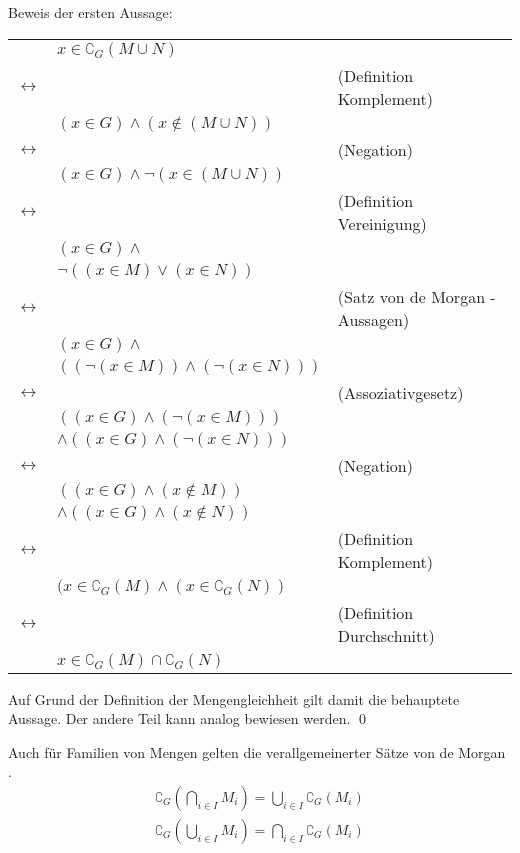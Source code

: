 \begin{Unit}
Beweis der ersten Aussage:\\
\begin{tabular}{l l | l}
                  & $x \in \complement_G(M \cup N)$ & \\
$\leftrightarrow$ & & (Definition Komplement) \\
                  & $(x \in G) \land (x \notin (M \cup N))$ & \\
$\leftrightarrow$ & & (Negation) \\
                  & $(x \in G) \land\neg (x \in (M \cup N))$ & \\
$\leftrightarrow$ & & (Definition Vereinigung) \\
                  & $(x \in G) \land$ & \\
                  &  $\neg((x \in M) \lor (x \in N))$ & \\
$\leftrightarrow$ & & (Satz von de Morgan - Aussagen) \\
                  & $(x \in G) \land $ &  \\
                  & $((\neg(x \in M)) \land (\neg(x \in N)))$ &  \\
$\leftrightarrow$ & & (Assoziativgesetz) \\
                  & $((x \in G) \land (\neg(x \in M)))$ & \\
                  & $\land ((x \in G) \land (\neg(x \in N)))$ & \\
$\leftrightarrow$ & & (Negation) \\
                  & $((x \in G) \land (x \notin M)) $ & \\
                  & $\land ((x \in G) \land (x \notin N)) $ & \\
$\leftrightarrow$ & & (Definition Komplement) \\
                  & $(x \in \complement_G(M) \land (x \in \complement_G(N))$ 
                    & \\
$\leftrightarrow$ & & (Definition Durchschnitt) \\
                  & $x \in \complement_G(M) \cap \complement_G(N)$ & \\
\end{tabular}

Auf Grund der Definition der Mengengleichheit gilt damit die behauptete 
Aussage. Der andere Teil kann analog bewiesen werden.
\qed
\end{Unit}

\begin{Unit}[Anmerkung]
Auch für Familien von Mengen gelten die verallgemeinerter Sätze von de Morgan
.
\begin{align}
  \complement_G(\bigcap_{i \in I}M_i) = \bigcup_{i \in I}\complement_G(M_i) \\
  \complement_G(\bigcup_{i \in I}M_i) = \bigcap_{i \in I}\complement_G(M_i)
\end{align}
\end{Unit}

